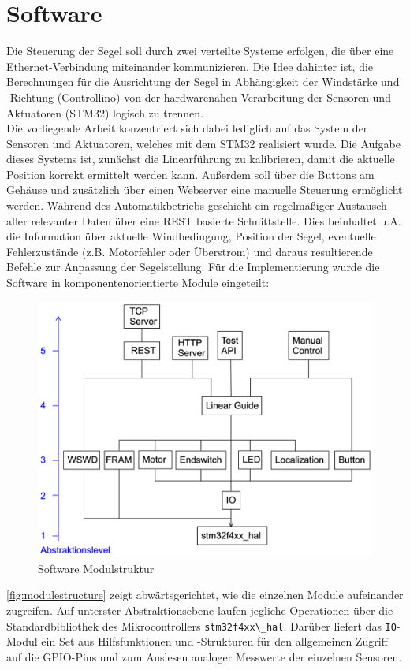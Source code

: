\newpage
\section{Software}
Die Steuerung der Segel soll durch zwei verteilte Systeme erfolgen, die über eine Ethernet-Verbindung miteinander kommunizieren. Die Idee dahinter ist, die Berechnungen für die Ausrichtung der Segel in Abhängigkeit der Windstärke und -Richtung (Controllino) von der hardwarenahen Verarbeitung der Sensoren und Aktuatoren (STM32) logisch zu trennen. \\

\noindent
Die vorliegende Arbeit konzentriert sich dabei lediglich auf das System der Sensoren und Aktuatoren, welches mit dem STM32 realisiert wurde. Die Aufgabe dieses Systems ist, zunächst die Linearführung zu kalibrieren, damit die aktuelle Position korrekt ermittelt werden kann. Außerdem soll über die Buttons am Gehäuse und zusätzlich über einen Webserver eine manuelle Steuerung ermöglicht werden. Während des Automatikbetriebs geschieht ein regelmäßiger Austausch aller relevanter Daten über eine REST basierte Schnittstelle. Dies beinhaltet u.A. die Information über aktuelle Windbedingung, Position der Segel, eventuelle Fehlerzustände (z.B. Motorfehler oder Überstrom) und daraus resultierende Befehle zur Anpassung der Segelstellung.
Für die Implementierung wurde die Software in komponentenorientierte Module eingeteilt:
\begin{figure}[H]
	\centering
	\includegraphics[width=0.6\linewidth]{images/Software/Modulestructure.png}
	\caption{Software Modulstruktur}
	\label{fig:modulestructure}
\end{figure}
\noindent
\autoref{fig:modulestructure} zeigt abwärtsgerichtet, wie die einzelnen Module aufeinander zugreifen. Auf unterster Abstraktionsebene laufen jegliche Operationen über die Standardbibliothek des Mikrocontrollers \verb|stm32f4xx\_hal|. Darüber liefert das \verb|IO|-Modul ein Set aus Hilfsfunktionen und -Strukturen für den allgemeinen Zugriff auf die GPIO-Pins und zum Auslesen analoger Messwerte der einzelnen Sensoren.\\

